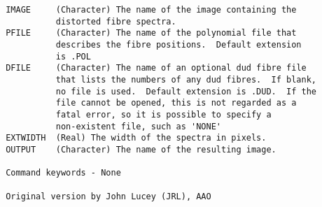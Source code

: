 \begin{description}
\begin{verbatim}
 IMAGE     (Character) The name of the image containing the
           distorted fibre spectra.
 PFILE     (Character) The name of the polynomial file that
           describes the fibre positions.  Default extension
           is .POL
 DFILE     (Character) The name of an optional dud fibre file
           that lists the numbers of any dud fibres.  If blank,
           no file is used.  Default extension is .DUD.  If the
           file cannot be opened, this is not regarded as a
           fatal error, so it is possible to specify a
           non-existent file, such as 'NONE'
 EXTWIDTH  (Real) The width of the spectra in pixels.
 OUTPUT    (Character) The name of the resulting image.

 Command keywords - None

 Original version by John Lucey (JRL), AAO
\end{verbatim}
\end{description}
